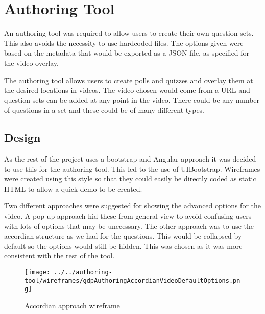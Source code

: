 \chapter{Authoring Tool} 
\label{Chapter:Authoring Tool}
An authoring tool was required to allow users to create their own question sets. This also avoids the necessity to use hardcoded files. The options given were based on the metadata that would be exported as a JSON file, as specified for the video overlay.

The authoring tool allows users to create polls and quizzes and overlay them at the desired locations in videos. The video chosen would come from a URL and question sets can be added at any point in the video. There could be any number of questions in a set and these could be of many different types.
\section{Design} 
\label{Section:Design}
As the rest of the project uses a bootstrap and Angular approach it was decided to use this for the authoring tool. This led to the use of UIBootstrap. Wireframes were created using this style so that they could easily be directly coded as static HTML to allow a quick demo to be created. 

Two different approaches were suggested for showing the advanced options for the video. A pop up approach hid these from general view to avoid confusing users with lots of options that may be unecessary. The other approach was to use the accordian structure as we had for the questions. This would be collapsed by default so the options would still be hidden. This was chosen as it was more consistent with the rest of the tool.

\begin{figure}[h]
	\centering 
	\texttt{[image: ../../authoring-tool/wireframes/gdpAuthoringAccordianVideoDefaultOptions.png]} 	
	\caption{\label{fig:sift} Accordian approach wireframe } 	
\end{figure}